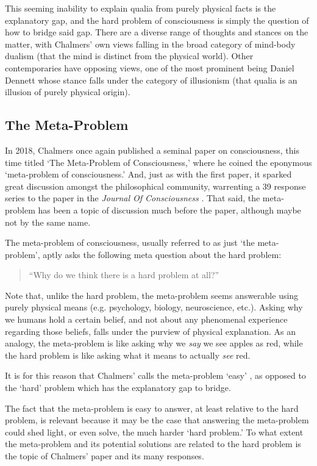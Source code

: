 \documentclass[11pt]{article}
\begin{document}
This seeming inability to explain qualia from purely physical facts is the explanatory gap, and the hard problem of consciousness is simply the question of how to bridge said gap. There are a diverse range of thoughts and stances on the matter, with Chalmers' own views falling in the broad category of mind-body dualism (that the mind is distinct from the physical world). Other contemporaries have opposing views, one of the most prominent being Daniel Dennett whose stance falls under the category of illusionism \cite{Dennett2016} (that qualia is an illusion of purely physical origin).

\subsection*{The Meta-Problem}
In 2018, Chalmers once again published a seminal paper on consciousness, this time titled `The Meta-Problem of Consciousness,' where he coined the eponymous `meta-problem of consciousness.' And, just as with the first paper, it sparked great discussion amongst the philosophical community, warrenting a 39 response series to the paper in the \textit{Journal Of Consciousness} \cite{Chalmers2020-HCW}. That said, the meta-problem has been a topic of discussion much before the paper, although maybe not by the same name.

The meta-problem of consciousness, usually referred to as just `the meta-problem', aptly asks the following meta question about the hard problem:
\begin{quote}
   ``Why do we think there is a hard problem at all?''
\end{quote}

Note that, unlike the hard problem, the meta-problem seems answerable using purely physical means (e.g. psychology, biology, neuroscience, etc.). Asking why we humans hold a certain belief, and not about any phenomenal experience regarding those beliefs, falls under the purview of physical explanation. As an analogy, the meta-problem is like asking why we \textit{say} we see apples as red, while the hard problem is like asking what it means to actually \textit{see} red.

It is for this reason that Chalmers' calls the meta-problem `easy' \cite{Chalmers2018-MPC}, as opposed to the `hard' problem which has the explanatory gap to bridge.

The fact that the meta-problem is easy to answer, at least relative to the hard problem, is relevant because it may be the case that answering the meta-problem could shed light, or even solve, the much harder `hard problem.' To what extent the meta-problem and its potential solutions are related to the hard problem is the topic of Chalmers' paper and its many responses.
\end{document}

